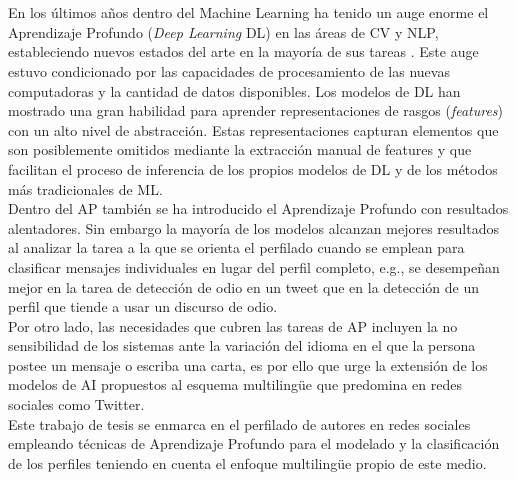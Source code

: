 \\
\\
En los últimos años dentro del Machine Learning ha tenido un auge enorme el Aprendizaje Profundo (\textit{Deep Learning} DL) en las áreas de CV y NLP, estableciendo nuevos estados del arte en la mayoría de sus tareas \citep{electronics8030292}. Este auge estuvo condicionado por las capacidades de procesamiento de las nuevas computadoras y la cantidad de datos disponibles. Los modelos de DL han mostrado una gran habilidad para aprender representaciones de rasgos (\textit{features}) con un alto nivel de abstracción. Estas representaciones capturan elementos que son posiblemente omitidos mediante la extracción manual de features y que facilitan el proceso de inferencia de los propios modelos de DL y de los métodos más tradicionales de ML. 
\\
Dentro del AP también se ha introducido el Aprendizaje Profundo con resultados alentadores. Sin embargo la mayoría de los modelos alcanzan mejores resultados al analizar la tarea a la que se orienta el perfilado cuando se emplean para clasificar mensajes individuales en lugar del perfil completo, e.g., se desempeñan mejor en la tarea de detección de odio en un tweet que en la detección de un perfil que tiende a usar un discurso de odio. 
\\
Por otro lado, las necesidades que cubren las tareas de AP incluyen la no sensibilidad de los sistemas ante la variación del idioma en el que la persona postee un mensaje o escriba una carta, es por ello que urge la extensión de los modelos de AI propuestos al esquema multilingüe que predomina en redes sociales como Twitter. \\Este trabajo de tesis se enmarca en el perfilado de autores en redes sociales empleando técnicas de Aprendizaje Profundo para el modelado y la clasificación de los perfiles teniendo en cuenta el enfoque multilingüe propio de este medio. 

